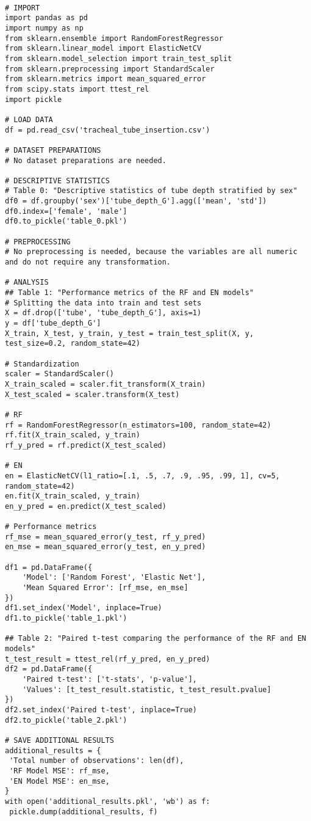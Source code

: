 \documentclass[11pt]{article}
\begin{document}
\begin{verbatim}

# IMPORT
import pandas as pd
import numpy as np
from sklearn.ensemble import RandomForestRegressor
from sklearn.linear_model import ElasticNetCV
from sklearn.model_selection import train_test_split
from sklearn.preprocessing import StandardScaler
from sklearn.metrics import mean_squared_error
from scipy.stats import ttest_rel
import pickle

# LOAD DATA
df = pd.read_csv('tracheal_tube_insertion.csv')

# DATASET PREPARATIONS
# No dataset preparations are needed.

# DESCRIPTIVE STATISTICS
# Table 0: "Descriptive statistics of tube depth stratified by sex"
df0 = df.groupby('sex')['tube_depth_G'].agg(['mean', 'std'])
df0.index=['female', 'male']
df0.to_pickle('table_0.pkl')

# PREPROCESSING
# No preprocessing is needed, because the variables are all numeric and do not require any transformation.

# ANALYSIS
## Table 1: "Performance metrics of the RF and EN models"
# Splitting the data into train and test sets
X = df.drop(['tube', 'tube_depth_G'], axis=1)
y = df['tube_depth_G']
X_train, X_test, y_train, y_test = train_test_split(X, y, test_size=0.2, random_state=42)

# Standardization
scaler = StandardScaler()
X_train_scaled = scaler.fit_transform(X_train)
X_test_scaled = scaler.transform(X_test)

# RF
rf = RandomForestRegressor(n_estimators=100, random_state=42)
rf.fit(X_train_scaled, y_train)
rf_y_pred = rf.predict(X_test_scaled)

# EN
en = ElasticNetCV(l1_ratio=[.1, .5, .7, .9, .95, .99, 1], cv=5, random_state=42)
en.fit(X_train_scaled, y_train)
en_y_pred = en.predict(X_test_scaled)

# Performance metrics
rf_mse = mean_squared_error(y_test, rf_y_pred)
en_mse = mean_squared_error(y_test, en_y_pred)

df1 = pd.DataFrame({
    'Model': ['Random Forest', 'Elastic Net'],
    'Mean Squared Error': [rf_mse, en_mse]
})
df1.set_index('Model', inplace=True)
df1.to_pickle('table_1.pkl')

## Table 2: "Paired t-test comparing the performance of the RF and EN models"
t_test_result = ttest_rel(rf_y_pred, en_y_pred)
df2 = pd.DataFrame({
    'Paired t-test': ['t-stats', 'p-value'],
    'Values': [t_test_result.statistic, t_test_result.pvalue]
})
df2.set_index('Paired t-test', inplace=True)
df2.to_pickle('table_2.pkl')

# SAVE ADDITIONAL RESULTS
additional_results = {
 'Total number of observations': len(df), 
 'RF Model MSE': rf_mse,
 'EN Model MSE': en_mse,
}
with open('additional_results.pkl', 'wb') as f:
 pickle.dump(additional_results, f)

\end{verbatim}
\end{document}
